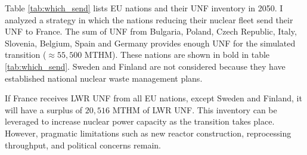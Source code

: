 Table \ref{tab:which_send} lists \gls{EU} nations and their \gls{UNF} inventory
in 2050. I analyzed a strategy in which 
the nations reducing their nuclear fleet send their \gls{UNF} to France.
The sum of \gls{UNF} from Bulgaria, Poland, Czech Republic, Italy, Slovenia,
Belgium, Spain and Germany
provides enough \gls{UNF} for the simulated transition ($\approx 55,500$ MTHM). 
These nations are shown in bold in table \ref{tab:which_send}.
Sweden and Finland are not considered because they have established
national nuclear waste management plans.

If France receives \gls{LWR} \gls{UNF} from all \gls{EU} nations,
except Sweden and Finland,
it will have a surplus of $20,516$ MTHM of \gls{LWR} \gls{UNF}. This
inventory can be leveraged to increase nuclear power capacity as
the transition takes place. However, pragmatic limitations such
as new reactor construction, reprocessing throughput, and
political concerns remain.


